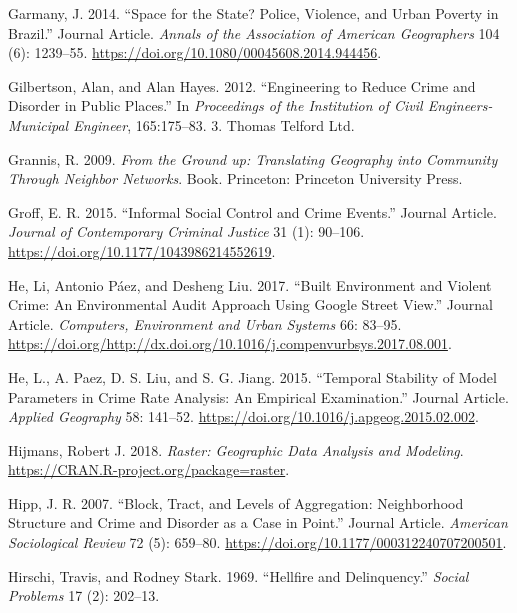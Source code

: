 \documentclass[smallextended]{svjour3}       %
\begin{document}
\leavevmode\hypertarget{ref-Garmany2014space}{}%
Garmany, J. 2014. ``Space for the State? Police, Violence, and Urban
Poverty in Brazil.'' Journal Article. \emph{Annals of the Association of
American Geographers} 104 (6): 1239--55.
\url{https://doi.org/10.1080/00045608.2014.944456}.

\leavevmode\hypertarget{ref-Gilbertson2012engineering}{}%
Gilbertson, Alan, and Alan Hayes. 2012. ``Engineering to Reduce Crime
and Disorder in Public Places.'' In \emph{Proceedings of the Institution
of Civil Engineers-Municipal Engineer}, 165:175--83. 3. Thomas Telford
Ltd.

\leavevmode\hypertarget{ref-Grannis2009from}{}%
Grannis, R. 2009. \emph{From the Ground up: Translating Geography into
Community Through Neighbor Networks}. Book. Princeton: Princeton
University Press.

\leavevmode\hypertarget{ref-Groff2015informal}{}%
Groff, E. R. 2015. ``Informal Social Control and Crime Events.'' Journal
Article. \emph{Journal of Contemporary Criminal Justice} 31 (1):
90--106. \url{https://doi.org/10.1177/1043986214552619}.

\leavevmode\hypertarget{ref-He2017built}{}%
He, Li, Antonio Páez, and Desheng Liu. 2017. ``Built Environment and
Violent Crime: An Environmental Audit Approach Using Google Street
View.'' Journal Article. \emph{Computers, Environment and Urban Systems}
66: 83--95.
\url{https://doi.org/http://dx.doi.org/10.1016/j.compenvurbsys.2017.08.001}.

\leavevmode\hypertarget{ref-He2015temporal}{}%
He, L., A. Paez, D. S. Liu, and S. G. Jiang. 2015. ``Temporal Stability
of Model Parameters in Crime Rate Analysis: An Empirical Examination.''
Journal Article. \emph{Applied Geography} 58: 141--52.
\url{https://doi.org/10.1016/j.apgeog.2015.02.002}.

\leavevmode\hypertarget{ref-Hijmans2018raster}{}%
Hijmans, Robert J. 2018. \emph{Raster: Geographic Data Analysis and
Modeling}. \url{https://CRAN.R-project.org/package=raster}.

\leavevmode\hypertarget{ref-Hipp2007block}{}%
Hipp, J. R. 2007. ``Block, Tract, and Levels of Aggregation:
Neighborhood Structure and Crime and Disorder as a Case in Point.''
Journal Article. \emph{American Sociological Review} 72 (5): 659--80.
\url{https://doi.org/10.1177/000312240707200501}.

\leavevmode\hypertarget{ref-Hirschi1969hellfire}{}%
Hirschi, Travis, and Rodney Stark. 1969. ``Hellfire and Delinquency.''
\emph{Social Problems} 17 (2): 202--13.
\end{document}
